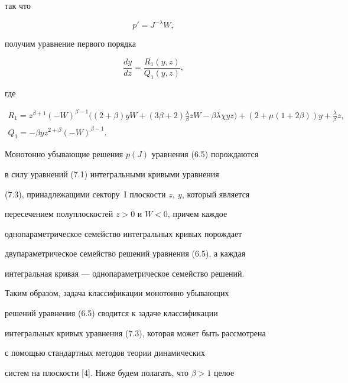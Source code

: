 так что  


\begin{equation} 


p'=J^{-\lambda}W, 


\end{equation} 


получим уравнение первого порядка 


\begin{equation} 


\frac{dy}{dz}=\frac{R_1(y,z)}{Q_1(y,z)}, 


\end{equation} 


где 


\begin{gather*} 


R_1=z^{\beta+1}(-W)^{\beta-1}\bigg((2+\beta) 


yW+(3\beta+2)\frac{\lambda}{\beta}zW-\beta\lambda\chi 


yz\bigg)+(2+\mu(1+2\beta))y+\frac{\lambda}{\beta}z,\\ 


Q_1=-\beta yz^{2+\beta}(-W)^{\beta-1}. 


\end{gather*} 


 


Монотонно убывающие решения $p(J)$ уравнения (6.5) порождаются  


в силу уравнений (7.1) интегральными кривыми уравнения 


(7.3), принадлежащими сектору~I плоскости $z,\ y$, который является  


пересечением полуплоскостей $z>0$ и $W<0$, причем каждое  


однопараметрическое семейство интегральных кривых порождает  


двупараметрическое семейство решений уравнения (6.5), а каждая  


интегральная кривая --- однопараметрическое семейство решений. 


Таким образом, задача классификации монотонно убывающих 


решений уравнения (6.5) сводится к задаче классификации  


интегральных кривых уравнения (7.3), которая может быть рассмотрена  


с помощью стандартных методов теории динамических  


систем на плоскости [4]. Ниже будем полагать, что $\beta>1$ целое 


